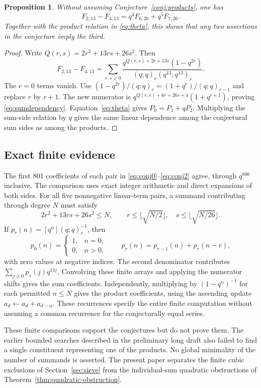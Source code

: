 \documentclass[11pt,reqno]{amsart}
\newtheorem{proposition}[theorem]{Proposition}
\theoremstyle{remark}
\numberwithin{equation}{section}
\begin{document}
\begin{proposition}\label{prop:dependencies}
Without assuming Conjecture~\ref{conj:products}, one has
\begin{equation}\label{eq:sumdependency}
 F_{2,13}-F_{4,13}=q^4F_{6,26}+q^5F_{7,26}.
\end{equation}
Together with the product relation in \eqref{eq:theta}, this shows
that any two assertions in the conjecture imply the third.
\end{proposition}
\begin{proof}
Write $Q(r,s)=2r^2+13rs+26s^2$. Then
\[
 F_{2,13}-F_{4,13}=
 \sum_{r,s\geq0}\frac{q^{Q(r,s)+2r+13s}(1-q^{2r})}
 {(q;q)_r(q^{13};q^{13})_s}.
\]
The $r=0$ terms vanish. Use
$(1-q^{2r})/(q;q)_r=(1+q^r)/(q;q)_{r-1}$ and replace $r$ by $r+1$.
The new numerator is
$q^{Q(r,s)+6r+26s+4}(1+q^{r+1})$, proving
\eqref{eq:sumdependency}. Equation~\eqref{eq:theta} gives $P_0=P_1+qP_2$.
Multiplying the sum-side relation by $q$ gives the same linear dependence
among the conjectural sum sides as among the products.
\end{proof}

\subsection{Exact finite evidence}\label{sec:finite}
The first 801 coefficients of each pair in
\eqref{eq:conj0}--\eqref{eq:conj2} agree, through $q^{800}$ inclusive.
The comparison uses exact integer arithmetic and direct expansions of both
sides. For all five nonnegative linear-term pairs, a summand contributing
through degree $N$ must satisfy
\[
 2r^2+13rs+26s^2\leq N,\qquad
 r\leq\lfloor\sqrt{N/2}\rfloor,\quad
 s\leq\lfloor\sqrt{N/26}\rfloor.
\]
If $p_r(n)=[q^n](q;q)_r^{-1}$, then
\[
 p_0(n)=\begin{cases}1,&n=0,\\0,&n>0,\end{cases}\qquad
 p_r(n)=p_{r-1}(n)+p_r(n-r),
\]
with zero values at negative indices. The second denominator contributes
$\sum_{j\geq0}p_s(j)q^{13j}$. Convolving these finite arrays and applying
the numerator shifts gives the sum coefficients. Independently, multiplying
by $(1-q^n)^{-1}$ for each permitted $n\leq N$ gives the product
coefficients, using the ascending update $a_d\leftarrow a_d+a_{d-n}$.
These recurrences specify the entire finite computation without assuming a
common recurrence for the conjecturally equal series.


These finite comparisons support the conjectures but do not prove them.
The earlier bounded searches described in the preliminary long draft
also failed to find a single constituent representing one of the products.
No global minimality of the number of summands is asserted. The present
paper separates the finite cubic exclusions of Section~\ref{sec:sieve}
from the individual-sum quadratic obstructions of
Theorem~\ref{thm:quadratic-obstruction}.
\end{document}
